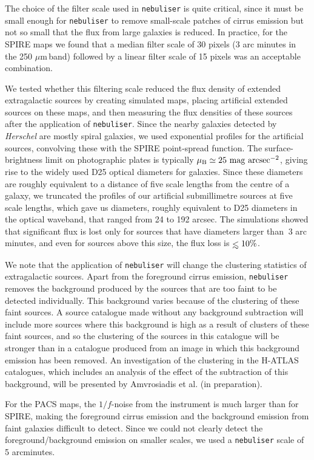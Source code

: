 \documentclass[useAMS,usenatbib]{mnras}
\def\lesssim{\mathrel{\hbox{\rlap{\hbox{\lower4pt\hbox{$\sim$}}}\hbox{$<$}}}}
\def\mic{ $\mu $m\,}
\begin{document}
The
choice of the filter scale
used in {\tt nebuliser} is quite critical, since
it  must be small enough for {\tt nebuliser} to remove
small-scale patches of cirrus emission
but not so small that the flux from large galaxies is reduced.
In practice, 
for the SPIRE maps we found that a median filter scale of 30 pixels (3
arc minutes in the 250 \mic band) followed by a linear filter scale of
15 pixels was an acceptable combination. 

We tested 
whether this filtering scale reduced the flux density of extended extragalactic
sources
by creating
simulated maps, placing artificial extended sources on these maps, and then
measuring the flux densities of these sources
after the application of
{\tt nebuliser}. 
Since the nearby galaxies detected by {\it Herschel} are mostly
spiral galaxies,
we used exponential profiles for the artificial sources, convolving
these with the
SPIRE point-spread function.
The surface-brightness limit on photographic plates
is typically
$\rm \mu_B \simeq 25\ mag\ arcsec^{-2}$, giving rise
to the widely used D25 optical diameters for galaxies.
Since these diameters are roughly equivalent to a distance of five scale
lengths from the centre of a galaxy, we truncated the profiles
of our artificial submillimetre sources at five scale lengths,
which gave us diameters, roughly equivalent to D25 diameters in the optical
waveband, that ranged from
24 to 192 arcsec.
The simulations showed that significant flux is lost only for
sources that have diameters larger than $~3$ arc minutes, and even for
sources above this size,
the flux loss is $\lesssim 10\%$.

We note that the application of {\tt nebuliser} will change the
clustering statistics of extragalactic sources.  Apart from the
foreground cirrus emission, {\tt nebuliser} removes the background
produced by the sources that are too faint to be detected
individually. This background varies because of the clustering of
these faint sources.  A source catalogue made without any background
subtraction will include more sources where this background is high as
a result of clusters of these faint sources, and so the clustering of
the sources in this catalogue will be stronger than in a catalogue
produced from an image in which this background emission has been
removed. An investigation of the clustering in the H-ATLAS catalogues,
which includes an analysis of the effect of the subtraction of this
background, will be presented by Amvrosiadis et al. (in preparation).

For the PACS maps, the $1/f$-noise from the instrument is much larger than
for SPIRE, making the foreground cirrus emission and the background
emission from faint galaxies difficult to detect. Since we could not
clearly detect the foreground/background emission on smaller
scales, we used a {\tt nebuliser} scale of 5 arcminutes.
\end{document}
